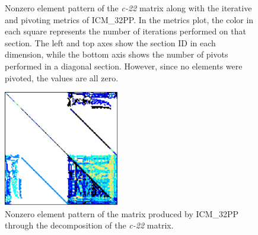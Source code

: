 \begin{figure}[ht!]
\begin{subfigure}[t]{0.51\textwidth}
		\label{Figure:comparing-decomposers-and-solvers->decomposition-project-benchmarks->decomposers-benchmark->comparison-of-execution-times-on-subset-of-matrices->matrix->c-22->icmxpp-metrics}
	\end{subfigure}
	\caption{Nonzero element pattern of the \textit{c-22} matrix along with the iterative and pivoting metrics of ICM\_32PP.
		In the metrics plot, the color in each square represents the number of iterations performed on that section.
		The left and top axes show the section ID in each dimension, while the bottom axis shows the number of pivots performed in a diagonal section.
		However, since no elements were pivoted, the values are all zero.
	}
	\label{Figure:comparing-decomposers-and-solvers->decomposition-project-benchmarks->decomposers-benchmark->comparison-of-execution-times-on-subset-of-matrices->matrix->c-22}
\end{figure}

\begin{figure}[ht!]
	\centering
	\includegraphics[width=0.45\textwidth, keepaspectratio, clip]{images/ch03/input-matrices/decomposition-benchmarks/c-22_icm32pp.pdf}
	\caption{Nonzero element pattern of the  matrix produced by ICM\_32PP through the decomposition of the \textit{c-22} matrix.}
	\label{Figure:comparing-decomposers-and-solvers->decomposition-project-benchmarks->decomposers-benchmark->comparison-of-execution-times-on-subset-of-matrices->matrix->c-22->icmxpp-LU-nonzero-element-pattern}
\end{figure}

